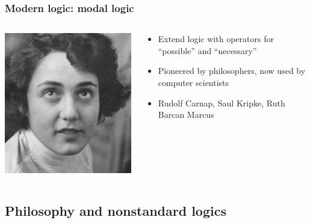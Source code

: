 \begin{frame}
  \frametitle{Modern logic: modal logic}

  \begin{columns}
    \begin{column}{.5\textwidth}
      \includegraphics[width=\textwidth]{../assets/barcan}
    \end{column}
    \begin{column}{.5\textwidth}
      \begin{itemize}
        \item Extend logic with operators for ``possible'' and ``necessary''
        \item Pioneered by philosophers, now used by computer scientists
        \item Rudolf Carnap, Saul Kripke, Ruth Barcan Marcus
      \end{itemize}
    \end{column}
  \end{columns}
\end{frame}

\newhourlecture

\subsection{Philosophy and nonstandard logics}

